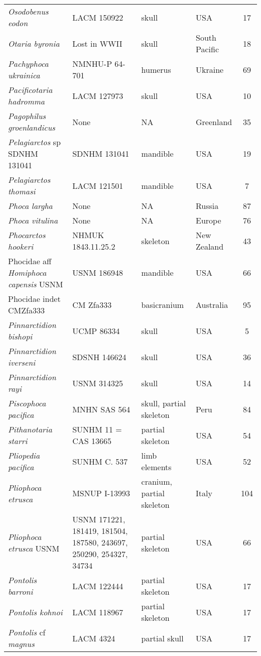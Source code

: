 \begin{longtable}{p{}p{}p{}lc}
\textit{Osodobenus eodon} &	LACM 150922 & 	skull & 	USA & 17\\
\textit{Otaria byronia} &	Lost in WWII & 	skull & 	South Pacific & 18\\
\textit{Pachyphoca ukrainica} & NMNHU-P 64-701	& humerus	& Ukraine & 69\\
\textit{Pacificotaria hadromma} & LACM 127973	& skull	& USA & 10\\
\textit{Pagophilus groenlandicus} &	None & 	NA & 	Greenland & 35\\
\textit{Pelagiarctos} sp SDNHM 131041 &	SDNHM 131041 & 	mandible & 	USA & 19\\
\textit{Pelagiarctos thomasi} &	LACM 121501 & 	mandible & 	USA & 7\\
\textit{Phoca largha} &	None & 	NA & 	Russia	 & 87\\
\textit{Phoca vitulina} &	None & 	NA & 	Europe & 76\\
\textit{Phocarctos hookeri} &	NHMUK 1843.11.25.2 & 	skeleton & 	New Zealand & 43\\
Phocidae aff \textit{Homiphoca capensis} USNM	& USNM 186948	& mandible	& USA & 66\\
Phocidae indet CMZfa333	& CM Zfa333 & 	basicranium & 	Australia & 95\\
\textit{Pinnarctidion bishopi} &	UCMP 86334 & 	skull & 	USA & 5\\
\textit{Pinnarctidion iverseni} &	SDSNH 146624 & 	skull & 	USA & 36\\
\textit{Pinnarctidion rayi} &	USNM 314325 & 	skull & 	USA & 14\\
\textit{Piscophoca pacifica} &	MNHN SAS 564 & 	skull, partial skeleton	 & Peru & 84\\
\textit{Pithanotaria starri} &	SUNHM 11 = CAS 13665 & 	partial skeleton & 	USA & 54\\
\textit{Pliopedia pacifica} &	SUNHM C. 537 & 	limb elements & 	USA & 52\\
\textit{Pliophoca etrusca} &	MSNUP I-13993 & 	cranium, partial skeleton & 	Italy & 104\\
\textit{Pliophoca etrusca} USNM & USNM 171221, 181419, 181504, 187580, 243697, 250290, 254327, 34734 &	partial skeleton & USA & 66\\
\textit{Pontolis barroni} &	LACM 122444 & 	partial skeleton & 	USA & 17\\
\textit{Pontolis kohnoi} &	LACM 118967 & 	partial skeleton & 	USA & 17\\
\textit{Pontolis} cf \textit{magnus} &	LACM 4324	& partial skull	& USA & 17\\

\end{longtable}

